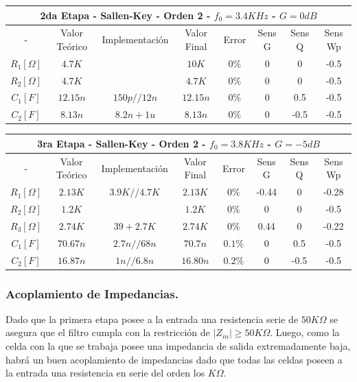 \begin{table}[H]
\centering
\begin{tabular}{@{}cccccccc@{}}
\multicolumn{8}{c}{2da Etapa - Sallen-Key - Orden 2 - $f_0 = 3.4KHz$ - $G=0dB$} \\ \midrule
- & Valor Teórico & Implementación & Valor Final & Error & Sens G & Sens Q & Sens Wp \\ \midrule
$R_1 [\Omega]$ & $4.7K$ &  & $10K$ & $0\%$ & 0 & 0 & -0.5 \\
$R_2 [\Omega]$ & $4.7K$ &  & $4.7K$ & $0\%$ & 0 & 0 & -0.5 \\
$C_1 [F]$ & $12.15n$ & $150p//12n$ & $12.15n$ & $0\%$ & 0 & 0.5 & -0.5 \\
$C_2 [F]$ & $8.13n$ & $8.2n+1u$ & $8.13n$ & $0\%$ & 0 & -0.5 & -0.5 \\ \bottomrule
\end{tabular}
\end{table}
 
\begin{table}[H]
\centering
\begin{tabular}{@{}cccccccc@{}}
\multicolumn{8}{c}{3ra Etapa - Sallen-Key - Orden 2 - $f_0 = 3.8KHz$ - $G=-5dB$} \\ \midrule
- & Valor Teórico & Implementación & Valor Final & Error & Sens G & Sens Q & Sens Wp \\ \midrule
$R_1 [\Omega]$ & $2.13K$ & $3.9K//4.7K$ & $2.13K$ & $0\%$ & -0.44 & 0 & -0.28 \\
$R_2 [\Omega]$ & $1.2K$ &  & $1.2K$ & $0\%$ & 0 & 0 & -0.5 \\
$R_3 [\Omega]$ & $2.74K$ & $39+2.7K$ & $2.74K$ & $0\%$ & 0.44 & 0 & -0.22 \\
$C_1 [F]$ & $70.67n$ & $2.7n//68n$ & $70.7n$ & $0.1\%$ & 0 & 0.5 & -0.5 \\
$C_2 [F]$ & $16.87n$ & $1n//6.8n$ & $16.80n$ & $0.2\%$ & 0 & -0.5 & -0.5 \\ \bottomrule
\end{tabular}
\end{table}

\subsubsection{Acoplamiento de Impedancias.}
Dado que la primera etapa posee a la entrada una resistencia serie de $50K\Omega$ se asegura que el filtro cumpla con la restricción de $|Z_{in}| \geq 50K\Omega$. Luego, como la celda con la que se trabaja posee una impedancia de salida extremadamente baja, habrá un buen acoplamiento de impedancias dado que todas las celdas poseen a la entrada una resistencia en serie del orden los $K\Omega$.

